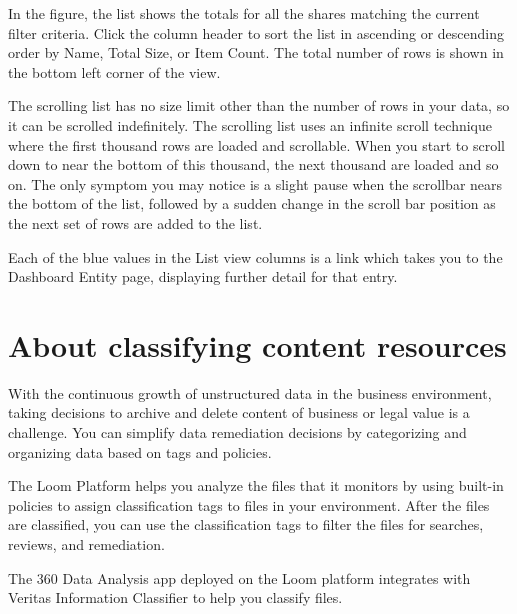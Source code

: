 \documentclass[letterpaper,10pt,english]{sphinxmanual}
\begin{document}
In the figure, the list shows the totals for all the shares matching the current filter criteria. Click the column header to sort the list in ascending or descending order by Name, Total Size, or Item Count. The total number of rows is shown in the bottom left corner of the view.

The scrolling list has no size limit other than the number of rows in your data, so it can be scrolled indefinitely. The scrolling list uses an infinite scroll technique where the first thousand rows are loaded and scrollable. When you start to scroll down to near the bottom of this thousand, the next thousand are loaded and so on. The only symptom you may notice is a slight pause when the scrollbar nears the bottom of the list, followed by a sudden change in the scroll bar position as the next set of rows are added to the list.

Each of the blue values in the List view columns is a link which takes you to the Dashboard Entity page, displaying further detail for that entry.


\section{About classifying content resources}
\label{\detokenize{mcdmp_app_ug:about-classifying-content-resources}}
With the continuous growth of unstructured data in the business environment, taking decisions to archive and delete content of business or legal value is a challenge. You can simplify data remediation decisions by categorizing and organizing data based on tags and policies.

The Loom Platform helps you analyze the files that it monitors by using built-in policies to assign classification tags to files in your environment. After the files are classified, you can use the classification tags to filter the files for searches, reviews, and remediation.

The 360 Data Analysis app deployed on the Loom platform integrates with Veritas Information Classifier to help you classify files.
\end{document}
